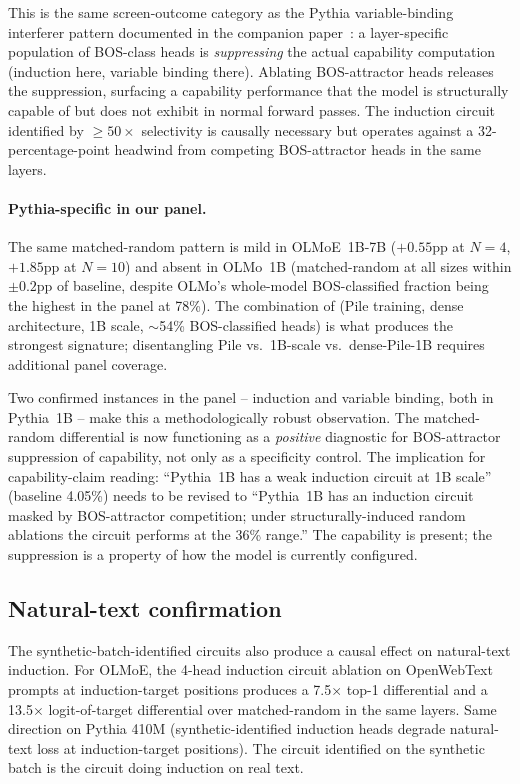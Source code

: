 \documentclass[11pt]{article}
\begin{document}
This is the same screen-outcome category as the Pythia variable-binding interferer pattern documented in the companion paper~\citep{paper3_circuits}: a layer-specific population of BOS-class heads is \emph{suppressing} the actual capability computation (induction here, variable binding there). Ablating BOS-attractor heads releases the suppression, surfacing a capability performance that the model is structurally capable of but does not exhibit in normal forward passes. The induction circuit identified by $\geq 50\times$ selectivity is causally necessary but operates against a 32-percentage-point headwind from competing BOS-attractor heads in the same layers.

\paragraph{Pythia-specific in our panel.} The same matched-random pattern is mild in OLMoE~1B-7B ($+0.55$pp at $N=4$, $+1.85$pp at $N=10$) and absent in OLMo~1B (matched-random at all sizes within $\pm 0.2$pp of baseline, despite OLMo's whole-model BOS-classified fraction being the highest in the panel at 78\%). The combination of (Pile training, dense architecture, 1B scale, $\sim$54\% BOS-classified heads) is what produces the strongest signature; disentangling Pile vs.\ 1B-scale vs.\ dense-Pile-1B requires additional panel coverage.

Two confirmed instances in the panel -- induction and variable binding, both in Pythia~1B -- make this a methodologically robust observation. The matched-random differential is now functioning as a \emph{positive} diagnostic for BOS-attractor suppression of capability, not only as a specificity control. The implication for capability-claim reading: ``Pythia~1B has a weak induction circuit at 1B scale'' (baseline 4.05\%) needs to be revised to ``Pythia~1B has an induction circuit masked by BOS-attractor competition; under structurally-induced random ablations the circuit performs at the 36\% range.'' The capability is present; the suppression is a property of how the model is currently configured.

\subsection{Natural-text confirmation}
\label{sec:naturaltext_induction}

The synthetic-batch-identified circuits also produce a causal effect on natural-text induction. For OLMoE, the 4-head induction circuit ablation on OpenWebText prompts at induction-target positions produces a 7.5$\times$ top-1 differential and a 13.5$\times$ logit-of-target differential over matched-random in the same layers. Same direction on Pythia 410M (synthetic-identified induction heads degrade natural-text loss at induction-target positions). The circuit identified on the synthetic batch is the circuit doing induction on real text.
\end{document}
